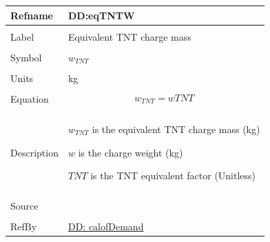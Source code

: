 \documentclass[12pt]{article}
\begin{document}
\vspace{\baselineskip}
\noindent
\begin{minipage}{\textwidth}
\begin{tabular}{>{\raggedright}p{}>{\raggedright\arraybackslash}p{}}
\toprule \textbf{Refname} & \textbf{DD:eqTNTW}
\label{DD:eqTNTW}
\\ \midrule \\
Label & Equivalent TNT charge mass
        
\\ \midrule \\
Symbol & ${w_{TNT}}$
         
\\ \midrule \\
Units & kg
        
\\ \midrule \\
Equation & \begin{displaymath}
           {w_{TNT}}=w TNT
           \end{displaymath}
\\ \midrule \\
Description & \begin{symbDescription}
              \item{${w_{TNT}}$ is the equivalent TNT charge mass (kg)}
              \item{$w$ is the charge weight (kg)}
              \item{$TNT$ is the TNT equivalent factor (Unitless)}
              \end{symbDescription}
\\ \midrule \\
Source & \cite{astm2009}
         
\\ \midrule \\
RefBy & \hyperref[DD:calofDemand]{DD: calofDemand}
        
\\ \bottomrule
\end{tabular}
\end{minipage}
\end{document}
